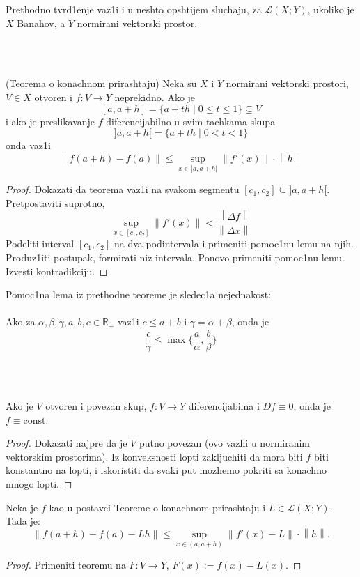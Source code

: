 \documentclass[a4paper,12pt]{article}
\newcommand{\R}{\mathbb{R}}
\newcommand{\psj}{\subseteq}
\newcommand{\norm}[1]{\left\lVert#1\right\rVert}
\begin{document}
\begin{nap}
Prethodno tvrd1enje vaz1i i u neshto opshtijem sluchaju, za $\mathcal{L}(X;Y)$, ukoliko je $X$ Banahov, a $Y$ normirani vektorski prostor.
\end{nap}
\\ \\
\begin{tma}
(Teorema o konachnom prirashtaju) Neka su $X$ i $Y$ normirani vektorski prostori, $V \in X$ otvoren i $f:V \to Y$ neprekidno. Ako je 
\[ [a, a+h] = \{a+th \mid 0 \leq t \leq 1\} \psj V \]
i ako je preslikavanje $f$ diferencijabilno u svim tachkama skupa 
\[]a, a+h[ = \{a+th \mid 0 < t < 1\}\]
onda vaz1i 
\[\norm{f(a+h) - f(a)} \leq \sup_{x \in ]a, a+h[} \norm{f'(x)} \cdot \norm{h}\]
\end{tma}
\begin{proof}
Dokazati da teorema vaz1i na svakom segmentu $[c_1, c_2] \psj ]a, a+h[$. Pretpostaviti suprotno, 
\[ \sup_{x \in [c_1, c_2]} \norm{f'(x)} < \frac{\norm{\Delta f}}{\norm{\Delta x}} \]
Podeliti interval $[c_1, c_2]$ na dva podintervala i primeniti pomoc1nu lemu na njih. Pro\-du\-z1i\-ti postupak, formirati niz intervala. Ponovo primeniti pomoc1nu lemu. Izvesti kon\-tra\-dik\-ci\-ju.
\end{proof}

\begin{nap}
Pomoc1na lema iz prethodne teoreme je sledec1a nejednakost: \\ \\
Ako za $\alpha, \beta, \gamma, a, b, c \in \R_+ $ vaz1i $c \leq a+b$ i $\gamma = \alpha + \beta$, onda je
\[\frac{c}{\gamma} \leq \max \{ \frac{a}{\alpha}, \frac{b}{\beta} \} \]
\end{nap}
\\ \\

\begin{posl}
	Ako je $V$ otvoren i povezan skup, $f:V \to Y$ diferencijabilna i $Df\equiv 0$, onda je $f \equiv \mathrm{const}$.
\end{posl}
\begin{proof}
	Dokazati najpre da je $V$ putno povezan (ovo vazhi u normiranim vektorskim prostorima). Iz konveksnosti lopti zakljuchiti da
	mora biti $f$ biti konstantno na lopti, i iskoristiti da svaki put mozhemo pokriti sa konachno mnogo lopti.
\end{proof}

\begin{posl}
	Neka je $f$ kao u postavci Teoreme o konachnom prirashtaju i $L \in \mathcal{L}(X; Y)$. Tada je:
	\[ \norm{f(a+h) - f(a) - Lh} \leq \sup_{x\in(a, a+h)} \norm{f'(x) - L} \cdot \norm h .\] 
\end{posl}
\begin{proof}
	Primeniti teoremu na $F:V \to Y$, \( F(x) := f(x) - L(x)\). 
\end{proof}
\end{document}
